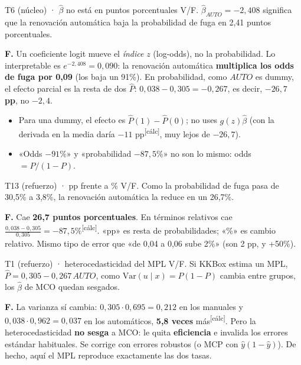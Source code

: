 \documentclass[10pt,a4paper]{article}
\newcommand{\calc}{\textsuperscript{\textcolor{blue!60!black}{[cálc]}}}
\newcommand{\Ph}{\hat P}
\begin{document}
\begin{enun}{T6 (núcleo) · $\hat\beta$ no está en puntos porcentuales}
V/F. $\hat\beta_{AUTO}=-2{,}408$ significa que la renovación automática baja la probabilidad de fuga en 2,41 puntos porcentuales.
\end{enun}
\begin{ejemplar}
\textbf{F.} Un coeficiente logit mueve el \emph{índice} $z$ (log-odds), no la probabilidad. Lo interpretable es $e^{-2,408}=0{,}090$: la renovación automática \textbf{multiplica los odds de fuga por 0,09} (los baja un 91\%). En probabilidad, como $AUTO$ es dummy, el efecto parcial es la resta de dos $\Ph$: $0{,}038-0{,}305=-0{,}267$, es decir, \textbf{$-26{,}7$ pp}, no $-2{,}4$.
\end{ejemplar}
\begin{trampa}
\begin{itemize}[leftmargin=*,itemsep=0pt,topsep=0pt]
\item Para una dummy, el efecto es $\Ph(1)-\Ph(0)$; no uses $g(z)\hat\beta$ (con la derivada en la media daría $-11$ pp\calc, muy lejos de $-26{,}7$).
\item «Odds $-91\%$» y «probabilidad $-87{,}5\%$» no son lo mismo: odds $=P/(1-P)$.
\end{itemize}
\end{trampa}

\begin{enun}{T13 (refuerzo) · pp frente a \%}
V/F. Como la probabilidad de fuga pasa de 30,5\% a 3,8\%, la renovación automática la reduce en un 26,7\%.
\end{enun}
\begin{ejemplar}
\textbf{F.} Cae \textbf{26,7 puntos porcentuales}. En términos relativos cae $\frac{0,038-0,305}{0,305}=-87{,}5\%$\calc. «pp» es resta de probabilidades; «\%» es cambio relativo. Mismo tipo de error que «de 0,04 a 0,06 sube 2\%» (son 2 pp, y +50\%).
\end{ejemplar}

\begin{enun}{T1 (refuerzo) · heterocedasticidad del MPL}
V/F. Si KKBox estima un MPL, $\Ph=0{,}305-0{,}267\,AUTO$, como $\mathrm{Var}(u\mid x)=P(1-P)$ cambia entre grupos, los $\hat\beta$ de MCO quedan sesgados.
\end{enun}
\begin{ejemplar}
\textbf{F.} La varianza sí cambia: $0{,}305\cdot0{,}695=0{,}212$ en los manuales y $0{,}038\cdot0{,}962=0{,}037$ en los automáticos, \textbf{5,8 veces} más\calc. Pero la heterocedasticidad \textbf{no sesga} a MCO: le quita \textbf{eficiencia} e invalida los errores estándar habituales. Se corrige con errores robustos (o MCP con $\hat y(1-\hat y)$). De hecho, aquí el MPL reproduce exactamente las dos tasas.
\end{ejemplar}
\end{document}
